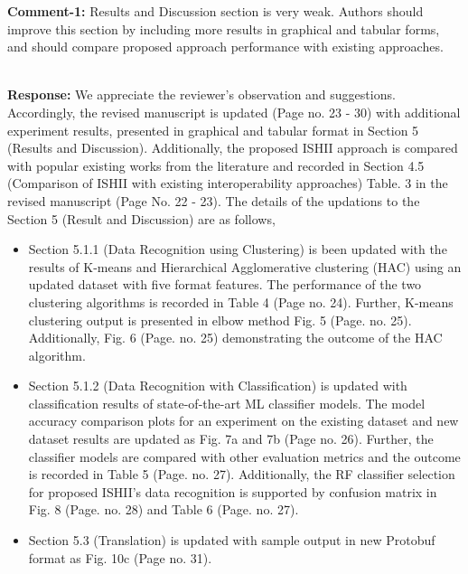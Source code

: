 \documentclass[a4paper,10pt]{article}
\begin{document}
\begin{enumerate}
{\color{blue} \item \textbf{Comment-1:} Results and Discussion section is very weak. Authors should improve this section by including more results in graphical and tabular forms, and should compare proposed approach performance with existing approaches.}\\

\textbf{Response:}  We appreciate the reviewer's observation and suggestions. Accordingly, the revised manuscript is updated (Page no. 23 - 30) with additional experiment results, presented in graphical and tabular format in Section 5 (Results and Discussion). Additionally, the proposed ISHII approach is compared with popular existing works from the literature and recorded in Section 4.5 (Comparison of ISHII with existing interoperability approaches) Table. 3 in the revised manuscript (Page No. 22 - 23). The details of the updations to the Section 5 (Result and Discussion) are as follows,

\begin{itemize}
    \item Section 5.1.1 (Data Recognition using Clustering) is been updated with the results of K-means and Hierarchical Agglomerative clustering (HAC) using an updated dataset with five format features. The performance of the two clustering algorithms is recorded in Table 4 (Page no. 24). Further, K-means clustering output is presented in elbow method  Fig. 5 (Page. no. 25). Additionally, Fig. 6 (Page. no. 25) demonstrating the outcome of the HAC algorithm.
    \item Section 5.1.2 (Data Recognition with Classification) is updated with classification results of state-of-the-art ML classifier models. The model accuracy comparison plots for an experiment on the existing dataset and new dataset results are updated as Fig. 7a and 7b (Page no. 26). Further, the classifier models are compared with other evaluation metrics and the outcome is recorded in Table 5 (Page. no. 27). Additionally, the RF classifier selection for proposed ISHII's data recognition is supported by confusion matrix in Fig. 8 (Page. no. 28) and Table 6 (Page. no. 27).
    \item Section 5.3 (Translation) is updated with sample output in new Protobuf format as Fig. 10c (Page no. 31). 
\end{itemize}


\end{enumerate}
\end{document}
